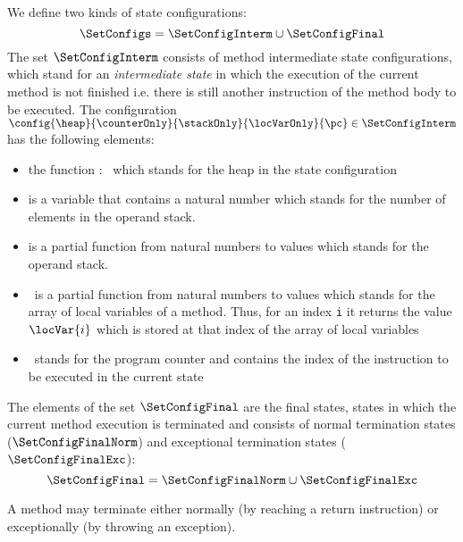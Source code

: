  We define two kinds of state configurations:
 $$\SetConfigs = \SetConfigInterm \cup \SetConfigFinal$$
 The set $\SetConfigInterm$ consists of method intermediate state configurations, which stand for an 
 \textit{intermediate state} in which the execution of the current method is not finished i.e.
 there is still another instruction of the method body to be executed.  
 The configuration $\config{\heap}{\counterOnly}{\stackOnly}{\locVarOnly}{\pc} \in \SetConfigInterm$ has the following elements:
               \begin{itemize}
                     \item the function \heap : \HeapSet \ which stands for the heap in the state configuration
	   
	             \item \counterOnly{} is a variable that contains a natural number which stands for the number of
		     elements in the operand stack.  

		     \item \stackOnly{} is a partial function from natural numbers to values  which  stands for 
		     the operand stack.

	             \item \locVarOnly \ is a partial function from natural numbers to values which stands for
		     the array of local variables of a method.
		     Thus,  for an index \texttt{i} it returns the value $\locVar{i}$ which is stored at that 
		     index of the array of local variables
	
	            \item \pc \ stands for the program counter and contains the index of the instruction to be executed in the current state
	        \end{itemize}


 The elements of the set $\SetConfigFinal$ are the final states, states in which the current method execution is terminated and consists of 
 normal termination states ($\SetConfigFinalNorm$) and exceptional termination states ($\SetConfigFinalExc$):
 $$\SetConfigFinal =  \SetConfigFinalNorm   \cup \SetConfigFinalExc $$ 
 
 A method may terminate either normally (by reaching a return instruction) or exceptionally (by throwing an exception).
 
